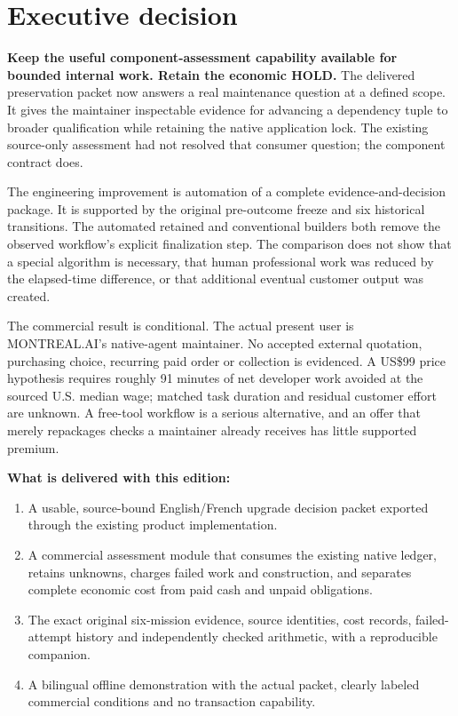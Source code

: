 \documentclass[11pt,letterpaper]{article}
\newcommand{\usd}[1]{US\$#1}
\begin{document}
\section*{Executive decision}
\textbf{Keep the useful component-assessment capability available for bounded internal work. Retain the economic HOLD.} The delivered preservation packet now answers a real maintenance question at a defined scope. It gives the maintainer inspectable evidence for advancing a dependency tuple to broader qualification while retaining the native application lock. The existing source-only assessment had not resolved that consumer question; the component contract does.

The engineering improvement is automation of a complete evidence-and-decision package. It is supported by the original pre-outcome freeze and six historical transitions. The automated retained and conventional builders both remove the observed workflow's explicit finalization step. The comparison does not show that a special algorithm is necessary, that human professional work was reduced by the elapsed-time difference, or that additional eventual customer output was created.

The commercial result is conditional. The actual present user is MONTREAL.AI's native-agent maintainer. No accepted external quotation, purchasing choice, recurring paid order or collection is evidenced. A \usd{99} price hypothesis requires roughly 91 minutes of net developer work avoided at the sourced U.S. median wage; matched task duration and residual customer effort are unknown. A free-tool workflow is a serious alternative, and an offer that merely repackages checks a maintainer already receives has little supported premium.

\textbf{What is delivered with this edition:}
\begin{enumerate}
\item A usable, source-bound English/French upgrade decision packet exported through the existing product implementation.
\item A commercial assessment module that consumes the existing native ledger, retains unknowns, charges failed work and construction, and separates complete economic cost from paid cash and unpaid obligations.
\item The exact original six-mission evidence, source identities, cost records, failed-attempt history and independently checked arithmetic, with a reproducible companion.
\item A bilingual offline demonstration with the actual packet, clearly labeled commercial conditions and no transaction capability.
\end{enumerate}
\end{document}
